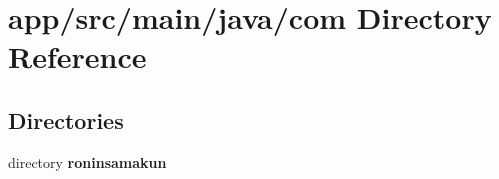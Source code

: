 \section{app/src/main/java/com Directory Reference}
\label{dir_f7e49c3cb4323d35b40a5c09184421c7}
\subsection*{Directories}
\begin{DoxyCompactItemize}
\item 
directory {\bf roninsamakun}
\end{DoxyCompactItemize}
